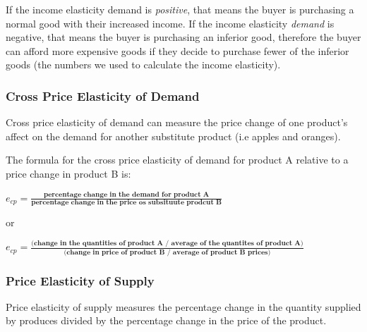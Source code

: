 \documentclass[a4paper, 12pt] {article}
\begin{document}
If the income elasticity demand is \emph{positive}, that means the buyer is
purchasing a normal good with their increased income.
If the income elasticity \emph{demand} is negative, that means the buyer is
purchasing an inferior good, therefore the buyer can afford more expensive
goods if they decide to purchase fewer of the inferior goods (the numbers we
used to calculate the income elasticity).

\subsubsection{Cross Price Elasticity of Demand}
Cross price elasticity of demand can measure the price change of one product's 
affect on the demand for another substitute product (i.e apples and oranges).

The formula for the cross price elasticity of demand for product A relative to
a price change in product B is:
\begin{description}
    \item $e_{cp} =
        \frac{\textbf{percentage change in the demand for product A}}
             {\textbf{percentage change in the price os subsituute prodcut B}}$
    \item or
    \item $e_{cp} = \frac{\textbf{(change in the quantities of product A /
                                    average of the quantites of product A)}}
                          {\textbf{(change in price of product B / 
                                    average of product B prices)}}$
\end{description}

\subsubsection{Price Elasticity of Supply}
Price elasticity of supply measures the percentage change in the quantity 
supplied by produces divided by the percentage change in the price of the
product.
\end{document}
